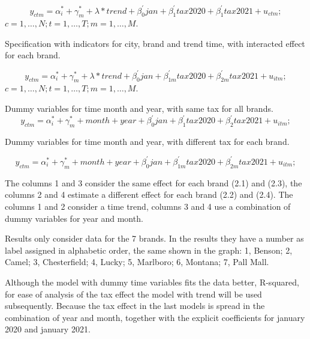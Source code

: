 \documentclass[]{article}
\begin{document}
\begin{equation*} 
y_{ctm}  = \alpha_{i}^{*} + \gamma_{m}^{*} + \lambda*trend + \beta_{0}^{'}jan + \beta_{1}^{'}tax2020 + \beta_{1}^{'}tax2021 + u_{ctm}
;   \tag{2.1}
\end{equation*}
$c  = 1,\ldots,N;  t=1,\ldots,T; m=1,\ldots,M. $

Specification with indicators for city, brand and trend time, with interacted effect for each brand.

\begin{equation*} 
	y_{ctm}  = \alpha_{i}^{*} + \gamma_{m}^{*} + \lambda*trend + \beta_{0}^{'}jan + \beta_{1m}^{'}tax2020 + \beta_{2m}^{'}tax2021 + u_{itm}
	;   \tag{2.2}
\end{equation*}
$c  = 1,\ldots,N;  t=1,\ldots,T; m=1,\ldots,M. $

Dummy variables for time month and year, with same tax for all brands.
\begin{equation*} 
	y_{ctm}  = \alpha_{i}^{*} + \gamma_{m}^{*} + month + year + \beta_{0}^{'}jan + \beta_{1}^{'}tax2020 + \beta_{2}^{'}tax2021 + u_{itm}
	;   \tag{2.3}
\end{equation*}

Dummy variables for time month and year, with different tax for each brand.

\begin{equation*} 
	y_{ctm}  = \alpha_{i}^{*} + \gamma_{m}^{*} + month + year + \beta_{0}^{'}jan + \beta_{1m}^{'}tax2020 + \beta_{2m}^{'}tax2021 + u_{itm}
	;   \tag{2.4}
\end{equation*}

The columns 1 and 3 consider the same effect for each brand (2.1) and (2.3), the columns 2 and 4 estimate a different effect for each brand (2.2) and (2.4). The columns 1 and 2 consider a time trend, columns 3 and 4 use a combination of dummy variables for year and month.


%

Results only consider data for the 7 brands. In the results they have a number as label assigned in alphabetic order, the same shown in the graph: 1, Benson; 2, Camel; 3, Chesterfield; 4, Lucky; 5, Marlboro; 6, Montana; 7, Pall Mall.

Although the model with dummy time variables fits the data better, R-squared, for ease of analysis of the tax effect the model with trend will be used subsequently. Because the tax effect in the last models is spread in the combination of year and month, together with the explicit coefficients for january 2020 and january 2021.  
\end{document}
